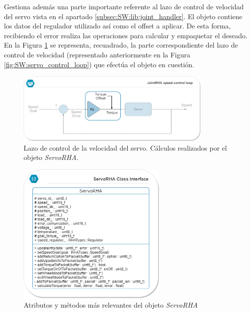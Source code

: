         Gestiona además una parte importante referente al lazo de control de velocidad del servo vista en el apartado \ref{subsec:SW:lib:joint_handler}. El objeto  contiene los datos del regulador utilizado así como el offset a aplicar. De esta forma, recibiendo el error realiza las operaciones para calcular y empaquetar el  deseado. En la Figura \ref{fig:SW:servo_control_loop_servo_part} se representa, recuadrado, la parte correspondiente del lazo de control de velocidad (representado anteriormente en la Figura \ref{fig:SW:servo_control_loop}) que efectúa el objeto en cuestión.
        \begin{figure}[H]
        \centering
        \includegraphics[width=0.85\textwidth]{figuras/Imagenes_SW/servo_control_loop_servo_part.png}   
        \caption{Lazo de control de la velocidad del servo. Cálculos realizados por el objeto \textit{ServoRHA}.}
        \label{fig:SW:servo_control_loop_servo_part}
        \end{figure}
        
        \begin{figure}[H]
            \centering
            \includegraphics[width=0.65\textwidth]{figuras/Imagenes_SW/class_diagram_SRHA.png}   
            \caption{Atributos y métodos más relevantes del objeto \textit{ServoRHA}}
            \label{fig:SW:class_diagram_SRHA}
        \end{figure}
        
